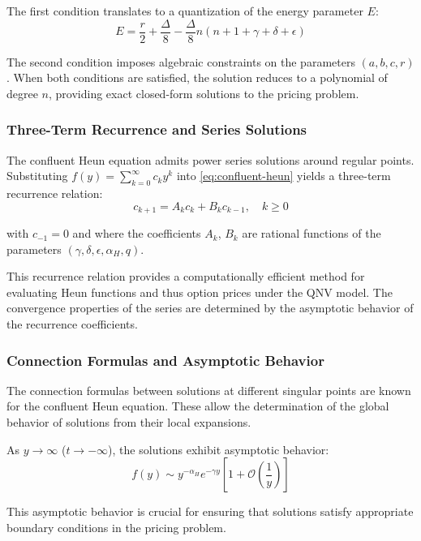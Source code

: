 \documentclass[a4paper,11pt]{article}
\begin{document}
The first condition translates to a quantization of the energy parameter $E$:
\begin{equation}
E = \frac{r}{2} + \frac{\Delta}{8} - \frac{\Delta}{8}n(n + 1 + \gamma + \delta + \epsilon)
\end{equation}

The second condition imposes algebraic constraints on the parameters $(a, b, c, r)$. When both conditions are satisfied, the solution reduces to a polynomial of degree $n$, providing exact closed-form solutions to the pricing problem.

\subsubsection{Three-Term Recurrence and Series Solutions}

The confluent Heun equation admits power series solutions around regular points. Substituting $f(y) = \sum_{k=0}^\infty c_k y^k$ into \eqref{eq:confluent-heun} yields a three-term recurrence relation:
\begin{equation}
c_{k+1} = A_k c_k + B_k c_{k-1}, \quad k \geq 0
\end{equation}

with $c_{-1} = 0$ and where the coefficients $A_k$, $B_k$ are rational functions of the parameters $(\gamma, \delta, \epsilon, \alpha_H, q)$.

This recurrence relation provides a computationally efficient method for evaluating Heun functions and thus option prices under the QNV model. The convergence properties of the series are determined by the asymptotic behavior of the recurrence coefficients.

\subsubsection{Connection Formulas and Asymptotic Behavior}

The connection formulas between solutions at different singular points are known for the confluent Heun equation. These allow the determination of the global behavior of solutions from their local expansions.

As $y \to \infty$ ($t \to -\infty$), the solutions exhibit asymptotic behavior:
\begin{equation}
f(y) \sim y^{-\alpha_H} e^{-\gamma y} \left[1 + \mathcal{O}\left(\frac{1}{y}\right)\right]
\end{equation}

This asymptotic behavior is crucial for ensuring that solutions satisfy appropriate boundary conditions in the pricing problem.
\end{document}
